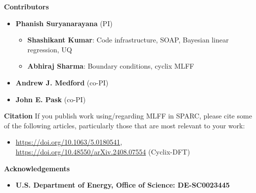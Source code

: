 

\begin{frame}[allowframebreaks]{\textbf{Contributors}} \label{Contributors}

	\begin{itemize}
	\item \textbf{Phanish Suryanarayana} (PI)
	\begin{itemize}
 	    \item \textbf{Shashikant Kumar}: Code infrastructure, SOAP, Bayesian linear regression, UQ \\    
 	    \item \textbf{Abhiraj Sharma}: Boundary conditions, cyclix MLFF \\  
 	\end{itemize}
  \item \textbf{Andrew J. Medford} (co-PI)
  \item \textbf{John E. Pask} (co-PI)

 	\end{itemize}
  
\end{frame}


\begin{frame}[allowframebreaks]{\textbf{Citation}} \label{Citation}
If you publish work using/regarding MLFF in SPARC, please cite some of the following articles, particularly those that are most relevant to your work:
\begin{itemize}
    \item \url{https://doi.org/10.1063/5.0180541}, \url{https://doi.org/10.48550/arXiv.2408.07554} (Cyclix-DFT)

\end{itemize}
\end{frame}


\begin{frame}[allowframebreaks]{\textbf{Acknowledgements}} \label{Acknowledgements}
\begin{itemize}
    \item \textbf{U.S. Department of Energy, Office of Science: DE-SC0023445 
        } \\
\end{itemize}
\end{frame}


